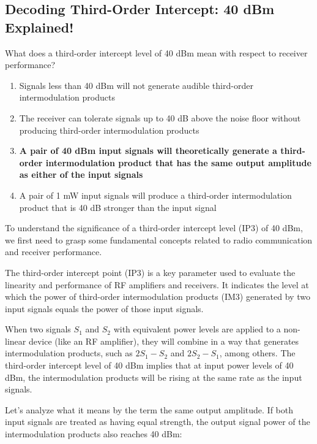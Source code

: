 \subsection{Decoding Third-Order Intercept: 40 dBm Explained!}

\begin{tcolorbox}[colback=gray!10, colframe=black, title=E4D10`]
What does a third-order intercept level of 40 dBm mean with respect to receiver performance?

\begin{enumerate}[label=\Alph*.]
    \item Signals less than 40 dBm will not generate audible third-order intermodulation products
    \item The receiver can tolerate signals up to 40 dB above the noise floor without producing third-order intermodulation products
    \item \textbf{A pair of 40 dBm input signals will theoretically generate a third-order intermodulation product that has the same output amplitude as either of the input signals}
    \item A pair of 1 mW input signals will produce a third-order intermodulation product that is 40 dB stronger than the input signal
\end{enumerate} \end{tcolorbox}



To understand the significance of a third-order intercept level (IP3) of 40 dBm, we first need to grasp some fundamental concepts related to radio communication and receiver performance. 

The third-order intercept point (IP3) is a key parameter used to evaluate the linearity and performance of RF amplifiers and receivers. It indicates the level at which the power of third-order intermodulation products (IM3) generated by two input signals equals the power of those input signals.

When two signals \( S_1 \) and \( S_2 \) with equivalent power levels are applied to a non-linear device (like an RF amplifier), they will combine in a way that generates intermodulation products, such as \( 2S_1 - S_2 \) and \( 2S_2 - S_1 \), among others. The third-order intercept level of 40 dBm implies that at input power levels of 40 dBm, the intermodulation products will be rising at the same rate as the input signals. 

Let's analyze what it means by the term the same output amplitude. If both input signals are treated as having equal strength, the output signal power of the intermodulation products also reaches 40 dBm:

